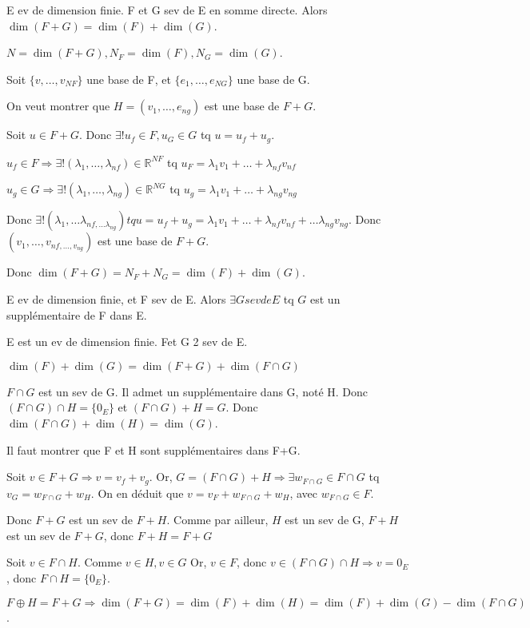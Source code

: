 \documentclass[french]{yLectureNote}
\newcommand{\R}[0]{\mathbb{R}}
\begin{document}
\begin{proposition}
E ev de dimension finie. F et G sev de E en somme directe. Alors \(\dim(F+G) = \dim(F)+\dim(G)\).
\end{proposition}
\begin{myproof}
 $N = \dim(F+G), N_F=\dim(F), N_G=\dim(G)$.

 Soit $\{v,\dots, v_{NF}\}$ une base de F, et $\{e_1,\dots, e_{NG}\}$ une base de G.

 On veut montrer que $H=(v_1,\dots, e_{ng})$ est une base de $F+G$.

 Soit $u\in F+G$. Donc $\exists !u_f\in F, u_G\in G$ tq $u=u_f+u_g$.

 $u_f \in F\Rightarrow \exists! (\lambda_1,\dots,\lambda_{nf})\in \R^{NF}$ tq $u_F = \lambda_1v_1+\dots+\lambda_{nf}v_{nf}$

  $u_g \in G\Rightarrow \exists! (\lambda_1,\dots,\lambda_{ng})\in \R^{NG}$ tq $u_g = \lambda_1v_1+\dots+\lambda_{ng}v_{ng}$

  Donc $\exists!(\lambda_1,\dots\lambda_{nf,\dots\lambda_{ng}}) tq u=u_f+u_g = \lambda_1v_1+\dots+\lambda_{nf}v_{nf}+\dots \lambda_{ng}v_{ng}$. Donc $(v_1,\dots,v_{nf,\dots, v_{ng}})$ est une base de $F+G$.

  Donc $\dim(F+G) = N_F+N_G = \dim(F)+\dim(G)$.
\end{myproof}
\begin{proposition}
E ev de dimension finie, et F sev de E. Alors $\exists G sev de E$ tq $G$ est un supplémentaire de F dans E.
\end{proposition}
\begin{proposition}
E est un ev de dimension finie. Fet G 2 sev de E.

\(\dim(F)+\dim(G) = \dim(F+G) + \dim(F\cap G)\)
\end{proposition}
\begin{myproof}
 $F\cap G$ est un sev de G. Il admet un supplémentaire dans G, noté H. Donc $(F\cap G)\cap H = \{0_E\}$ et $(F\cap G)+H=G$. Donc $\dim(F\cap G)+\dim(H) = \dim(G)$.

 Il faut montrer que F et H sont supplémentaires dans F+G.

 Soit $v\in F+G\Rightarrow v = v_f+v_g$. Or, $G=(F\cap G)+H \Rightarrow \exists w_{F\cap G} \in  F\cap G$ tq $v_G = w_{F\cap G} + w_H$. On en déduit que $v = v_F+ w_{F\cap G}+w_H$, avec $w_{F\cap G} \in F$.

 Donc $F+G$ est un sev de $F+H$. Comme par ailleur, $H$ est un sev de G, $F+H$ est un sev de $F+G$, donc $F+H=F+G$


 Soit $v\in F\cap H$. Comme $v\in H, v\in G$ Or, $v\in F$, donc $v\in (F\cap G)\cap H \Rightarrow v=0_E$, donc $F\cap H = \{0_E\}$.

 $F\oplus H = F+G \Rightarrow \dim(F+G) = \dim(F)+\dim(H) = \dim(F) + \dim(G) - \dim(F\cap G)$.
\end{myproof}
\end{document}
